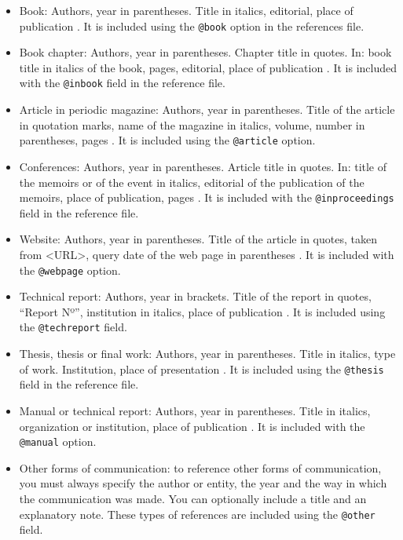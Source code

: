 \documentclass[eng]{ajceam-class}
\begin{document}
\begin{itemize}
 \item Book: Authors, year in parentheses. Title in italics, editorial, place of publication \cite{Alarcos1999}. It is included using the \texttt{@book} option in the references file.
%
 \item Book chapter: Authors, year in parentheses. Chapter title in quotes. In: book title in italics of the book, pages, editorial, place of publication \cite{Mitchell2001}. It is included with the \texttt{@inbook} field in the reference file.
%
 \item Article in periodic magazine: Authors, year in parentheses. Title of the article in quotation marks, name of the magazine in italics, volume, number in parentheses, pages \cite{ArslanHansen1996, WangEtAl2015}. It is included using the \texttt{@article} option.
%
 \item Conferences: Authors, year in parentheses. Article title in quotes. In: title of the memoirs or of the event in italics, editorial of the publication of the memoirs, place of publication, pages \cite{BarkovaJouvet1999}. It is included with the \texttt{@inproceedings} field in the reference file.
%
 \item Website: Authors, year in parentheses. Title of the article in quotes, taken from <URL>, query date of the web page in parentheses \cite{CFDwebpage}. It is included with the \texttt{@webpage} option.
%
 \item Technical report: Authors, year in brackets. Title of the report in quotes, ``Report Nº'', institution in italics, place of publication \cite{NACA460}. It is included using the \texttt{@techreport} field.
%
 \item Thesis, thesis or final work: Authors, year in parentheses. Title in italics, type of work. Institution, place of presentation \cite{Krause2014}. It is included using the \texttt{@thesis} field in the reference file.
%
 \item Manual or technical report: Authors, year in parentheses. Title in italics, organization or institution, place of publication \cite{Indura2010}. It is included with the \texttt{@manual} option.
%
 \item Other forms of communication: to reference other forms of communication, you must always specify the author or entity, the year and the way in which the communication was made. You can optionally include a title and an explanatory note. These types of references are included using the \texttt{@other} field.
\end{itemize}
\end{document}
